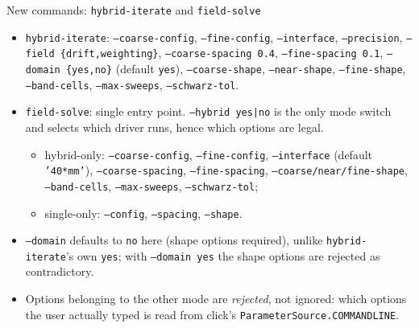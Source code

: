 \documentclass[10pt,aspectratio=169]{beamer}
\newcommand{\ti}[1]{\texttt{\footnotesize #1}}
\begin{document}
\begin{frame}[allowframebreaks]{New commands: \texttt{hybrid-iterate} and \texttt{field-solve}}
  \begin{itemize}\small
  \item \ti{hybrid-iterate}: \ti{--coarse-config}, \ti{--fine-config}, \ti{--interface},
        \ti{--precision}, \ti{--field \{drift,weighting\}}, \ti{--coarse-spacing 0.4},
        \ti{--fine-spacing 0.1}, \ti{--domain \{yes,no\}} (default \ti{yes}),
        \ti{--coarse-shape}, \ti{--near-shape}, \ti{--fine-shape}, \ti{--band-cells},
        \ti{--max-sweeps}, \ti{--schwarz-tol}.
  \item \ti{field-solve}: single entry point. \ti{--hybrid yes|no} is the only mode switch
        and selects which driver runs, hence which options are legal.
    \begin{itemize}
    \item hybrid-only: \ti{--coarse-config}, \ti{--fine-config}, \ti{--interface}
          (default \ti{'40*mm'}), \ti{--coarse-spacing}, \ti{--fine-spacing},
          \ti{--coarse/near/fine-shape}, \ti{--band-cells}, \ti{--max-sweeps},
          \ti{--schwarz-tol};
    \item single-only: \ti{--config}, \ti{--spacing}, \ti{--shape}.
    \end{itemize}
  \item \ti{--domain} defaults to \ti{no} here (shape options required), unlike
        \ti{hybrid-iterate}'s own \ti{yes}; with \ti{--domain yes} the shape options are
        rejected as contradictory.
  \item Options belonging to the other mode are \emph{rejected}, not ignored: which options
        the user actually typed is read from click's
        \ti{ParameterSource.COMMANDLINE}.
  \end{itemize}
\end{frame}
\end{document}
